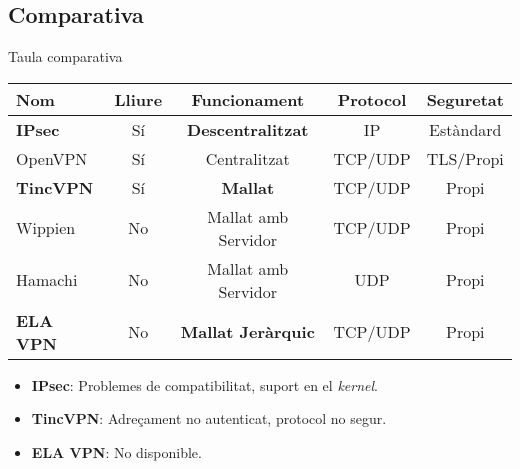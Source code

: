 \subsection{Comparativa}
    \begin{frame}{Taula comparativa}
        \begin{center}
\begin{tabular}{|l|c|c|c|c|}
\hline
Nom & Lliure & Funcionament & Protocol & Seguretat \\ \hline \hline
\bf IPsec & Sí & \bf Descentralitzat & IP & Estàndard \\ \hline
OpenVPN & Sí & Centralitzat & TCP/UDP & TLS/Propi \\ \hline
\bf TincVPN & Sí & \bf Mallat & TCP/UDP & \alert{Propi} \\ \hline
Wippien & No & Mallat amb Servidor & TCP/UDP & Propi \\ \hline
Hamachi & No & Mallat amb Servidor & UDP & Propi \\ \hline
\bf ELA VPN & No & \bf Mallat Jeràrquic & TCP/UDP & Propi \\ \hline
\end{tabular}
        \end{center}
        \begin{alertblock}{}\small
		\begin{itemize}
\item \textbf{IPsec}: Problemes de compatibilitat, suport en el \emph{kernel}.
\item \textbf{TincVPN}: Adreçament no autenticat, protocol no segur.
\item \textbf{ELA VPN}: No disponible.
		\end{itemize}
        \end{alertblock}
    \end{frame}
